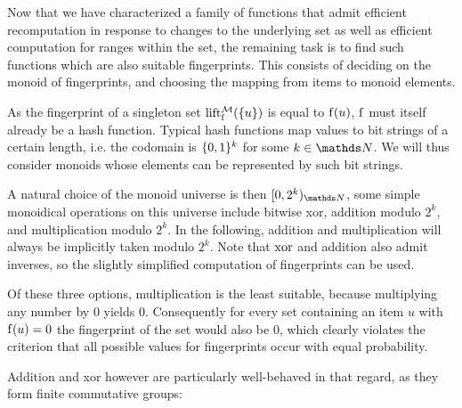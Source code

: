 Now that we have characterized a family of functions that admit efficient recomputation in response to changes to the underlying set as well as efficient computation for ranges within the set, the remaining task is to find such functions which are also suitable fingerprints. This consists of deciding on the monoid of fingerprints, and choosing the mapping from items to monoid elements.

As the fingerprint of a singleton set $\operatorname{lift_{\operatorname{f}}^{\mathcal{M}}}(\{u\})$ is equal to $\operatorname{f}(u)$, $\operatorname{f}$ must itself already be a hash function. Typical hash functions map values to bit strings of a certain length, i.e. the codomain is $\{0, 1\}^k$ for some $k \in \N$. We will thus consider monoids whose elements can be represented by such bit strings.

A natural choice of the monoid universe is then $\range{0}{2^k}{\N}$, some simple monoidical operations on this universe include bitwise xor, addition modulo $2^k$, and multiplication modulo $2^k$. In the following, addition and multiplication will always be implicitly taken modulo $2^k$. Note that $\operatorname{xor}$ and addition also admit inverses, so the slightly simplified computation of fingerprints can be used.

Of these three options, multiplication is the least suitable, because multiplying any number by $0$ yields $0$. Consequently for every set containing an item $u$ with $\operatorname{f}(u) = 0$ the fingerprint of the set would also be $0$, which clearly violates the criterion that all possible values for fingerprints occur with equal probability.

Addition and xor however are particularly well-behaved in that regard, as they form finite commutative groups:

